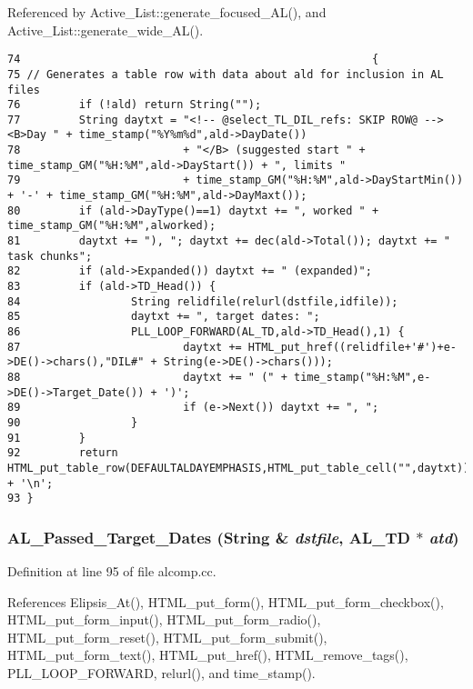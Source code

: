 Referenced by Active\_\-List::generate\_\-focused\_\-AL(), and Active\_\-List::generate\_\-wide\_\-AL().



\footnotesize\begin{verbatim}74                                                      {
75 // Generates a table row with data about ald for inclusion in AL files
76         if (!ald) return String("");
77         String daytxt = "<!-- @select_TL_DIL_refs: SKIP ROW@ --><B>Day " + time_stamp("%Y%m%d",ald->DayDate())
78                         + "</B> (suggested start " + time_stamp_GM("%H:%M",ald->DayStart()) + ", limits "
79                         + time_stamp_GM("%H:%M",ald->DayStartMin()) + '-' + time_stamp_GM("%H:%M",ald->DayMaxt());
80         if (ald->DayType()==1) daytxt += ", worked " + time_stamp_GM("%H:%M",alworked);
81         daytxt += "), "; daytxt += dec(ald->Total()); daytxt += " task chunks";
82         if (ald->Expanded()) daytxt += " (expanded)";
83         if (ald->TD_Head()) {
84                 String relidfile(relurl(dstfile,idfile));
85                 daytxt += ", target dates: ";
86                 PLL_LOOP_FORWARD(AL_TD,ald->TD_Head(),1) {
87                         daytxt += HTML_put_href((relidfile+'#')+e->DE()->chars(),"DIL#" + String(e->DE()->chars()));
88                         daytxt += " (" + time_stamp("%H:%M",e->DE()->Target_Date()) + ')';
89                         if (e->Next()) daytxt += ", ";
90                 }
91         }
92         return HTML_put_table_row(DEFAULTALDAYEMPHASIS,HTML_put_table_cell("",daytxt)) + '\n';
93 }
\end{verbatim}\normalsize 
{}
\subsubsection{ AL\_\-Passed\_\-Target\_\-Dates ({\bf String} \& {\em dstfile}, {\bf AL\_\-TD} $\ast$ {\em atd})}\label{dil2al_8hh_a286}




Definition at line 95 of file alcomp.cc.

References Elipsis\_\-At(), HTML\_\-put\_\-form(), HTML\_\-put\_\-form\_\-checkbox(), HTML\_\-put\_\-form\_\-input(), HTML\_\-put\_\-form\_\-radio(), HTML\_\-put\_\-form\_\-reset(), HTML\_\-put\_\-form\_\-submit(), HTML\_\-put\_\-form\_\-text(), HTML\_\-put\_\-href(), HTML\_\-remove\_\-tags(), PLL\_\-LOOP\_\-FORWARD, relurl(), and time\_\-stamp().

